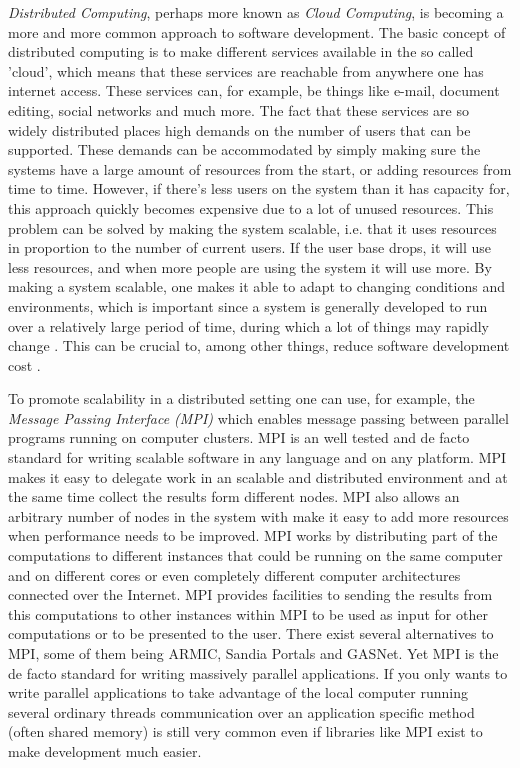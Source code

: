\documentclass{article}
\begin{document}
{\emph{Distributed Computing}, perhaps more known as \emph{Cloud Computing}, is
becoming a more and more common approach to software development. The basic
concept of distributed computing is to make different services available in the
so called 'cloud', which means that these services are reachable from anywhere
one has internet access. These services can, for example, be things like
e-mail, document editing, social networks and much more. The fact that these
services are so widely distributed places high demands on the number of users
that can be supported. These demands can be accommodated by simply making sure
the systems have a large amount of resources from the start, or adding
resources from time to time. However, if there's less users on the system than
it has capacity for, this approach quickly becomes expensive due to a lot of
unused resources. This problem can be solved by making the system scalable,
i.e. that it uses resources in proportion to the number of current users. If
the user base drops, it will use less resources, and when more people are using
the system it will use more. By making a system scalable, one makes it able to
adapt to changing conditions and environments, which is important since a
system is generally developed to run over a relatively large period of time,
during which a lot of things may rapidly change \cite{van1998software}
\cite{caruso1997toward}. This can be crucial to, among other things, reduce
software development cost \cite{fayad2005towards}.

To promote scalability in a distributed setting one can use, for example, the
\emph{Message Passing Interface (MPI)} which enables message passing between
parallel programs running on computer clusters. MPI is
an well tested and de facto\cite{wu2008using} standard for writing scalable
software in any language and on any platform. MPI makes it easy to delegate
work in an scalable and distributed environment and at the same time collect
the results form different nodes. MPI also allows an arbitrary number of nodes
in the system with make it easy to add more resources when performance needs to
be improved. \cite{gropp1996high}
\newline
MPI works by distributing part of the computations to different instances that
could be running on the same computer and on different cores or even completely
different computer architectures connected over the Internet. MPI provides
facilities to sending the results from this computations to other instances
within MPI to be used as input for other computations or to be presented to the
user. There exist several alternatives\cite{mpialternatives} to MPI, some of
them being ARMIC, Sandia Portals and GASNet. Yet MPI is the de facto
\cite{mpialternatives} standard for writing massively parallel applications. If
you only wants to write parallel applications to take advantage of the local
computer running several ordinary threads communication over an application
specific method (often shared memory) is still very common \cite{getov1998high}
even if libraries like MPI exist to make development much easier.

}
\end{document}
